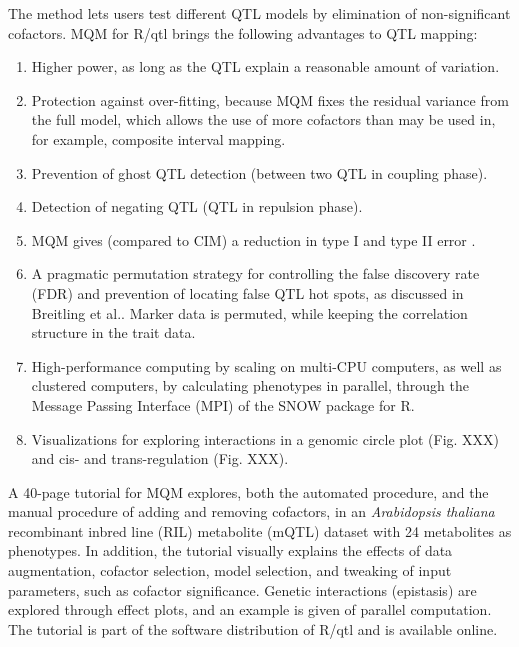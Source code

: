 \documentclass[8pt, twoside, a5paper]{report}
\begin{document}
The method lets users test different QTL models by elimination of non-significant cofactors. MQM for R/qtl brings the 
following advantages to QTL mapping:
\begin{enumerate}\itemsep1pt
\item Higher power, as long as the QTL explain a reasonable amount of variation.
\item Protection against over-fitting, because MQM fixes the residual variance from the full model, which allows the 
use of more cofactors than may be used in, for example, composite interval mapping\cite{Zeng:1994}.
\item Prevention of ghost QTL detection (between two QTL in coupling phase).
\item Detection of negating QTL (QTL in repulsion phase). 
\item MQM gives (compared to CIM) a reduction in type I and type II error \cite{Handbook:Jansen:2007}.
\item A pragmatic permutation strategy for controlling the false discovery rate (FDR) and prevention of locating 
false QTL hot spots, as discussed in Breitling et al.\cite{Breitling:2008a}. Marker data is permuted, while keeping 
the correlation structure in the trait data.
\item High-performance computing by scaling on multi-CPU computers, as well as clustered computers, by calculating 
phenotypes in parallel, through the Message Passing Interface (MPI) of the SNOW package for R\cite{Tierney:2009}.
\item Visualizations for exploring interactions in a genomic circle plot (Fig. XXX) and cis- and trans-regulation (Fig. XXX).
\end{enumerate}

A 40-page tutorial for MQM explores, both the automated procedure, and the manual procedure of adding and removing 
cofactors, in an \emph{Arabidopsis thaliana} recombinant inbred line (RIL) metabolite (mQTL) dataset with 24 metabolites 
as phenotypes\cite{Fu:2007}. In addition, the tutorial visually explains the effects of data augmentation, cofactor 
selection, model selection, and tweaking of input parameters, such as cofactor significance. Genetic interactions 
(epistasis) are explored through effect plots, and an example is given of parallel computation. The tutorial is part 
of the software distribution of R/qtl and is available online.
\end{document}
